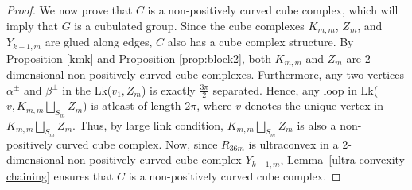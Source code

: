 \documentclass[oneside,11pt,reqno]{amsart}
\theoremstyle{definition}
\begin{document}
\begin{proof}
We now prove that $C$ is a non-positively curved cube complex, which will imply that $G$ is a cubulated group. Since the cube complexes $K_{m,m}$, $Z_m$, and $Y_{k-1,m}$ are glued along edges, $C$ also has a cube complex structure.  By Proposition \ref{kmk} and Proposition \ref{prop:block2}, both $K_{m,m}$ and $Z_m$ are $2$-dimensional non-positively curved cube complexes. Furthermore, any two vertices $\alpha^{\pm}$ and $\beta^{\pm}$ in the Lk($v_1, Z_m$) is exactly $\frac{3\pi}{2}$ separated. Hence, any loop in Lk($v, K_{m,m} \bigsqcup_{S_m} Z_{m}$) is atleast of length $2\pi$, where $v$ denotes the unique vertex in $K_{m,m} \bigsqcup_{S_m} Z_{m}$. Thus, by large link condition,  $K_{m,m} \bigsqcup_{S_m} Z_{m}$ is also a non-positively curved cube complex. Now, since $R_{36m}$ is ultraconvex in a $2$-dimensional non-positively curved cube complex $Y_{k-1,m}$, Lemma~\ref{ultra convexity chaining} ensures that $C$ is a non-positively curved cube complex.









\end{proof}
\end{document}
